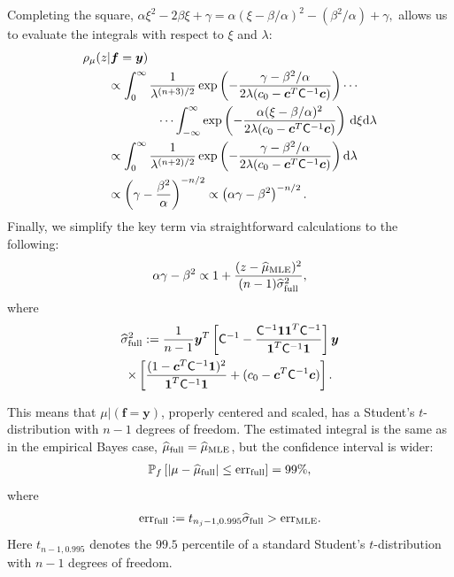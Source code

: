 \documentclass[twocolumn]{svjour3}          %
\newcommand{\bm}[1]{\boldsymbol{#1}}
\newcommand{\D}[1]{\text{d}{#1}}
\newcommand{\vc}{\bm{c}}
\newcommand{\vf}{\bm{f}}
\newcommand{\vy}{\bm{y}}
\newcommand{\vone}{\bm{1}}
\newcommand{\mC}{\mathsf{C}}
\newcommand{\hmu}{\widehat{\mu}}
\newcommand{\hsigma}{\widehat{\sigma}}
\newcommand{\MLE}{\textup{MLE}}
\newcommand{\full}{\textup{full}}
\newcommand{\err}{\textup{err}}
\begin{document}
Completing the square, $
\alpha \xi^2 -2 \beta \xi + \gamma 
= \alpha (\xi -\beta/\alpha)^2  - (\beta^2/\alpha) + \gamma,
$
allows us to evaluate the integrals with respect to $\xi$ and $\lambda$:
\begin{align*}
\MoveEqLeft{\rho_{\mu}(z | \vf = \vy)} \\
& \propto \displaystyle \int_{0}^\infty  \frac{1}{\lambda^{(n+3)/2}}  \exp\left( -\frac{  \gamma - \beta^2/\alpha}{2\lambda(c_0  -\vc ^T \mC^{-1} \vc)} \right)  \cdots \\
& \qquad \qquad \cdots \int_{-\infty}^\infty  \exp\left( -\frac{\alpha (\xi -\beta/\alpha)^2}{2\lambda(c_0  -\vc ^T \mC^{-1} \vc)} \right) \, \D \xi \D \lambda \\
& \propto \displaystyle \int_{0}^\infty  \frac{1}{\lambda^{(n+2)/2}}  \exp\left( -\frac{  \gamma - \beta^2/\alpha}{2\lambda(c_0  -\vc ^T \mC^{-1} \vc)} \right) \D \lambda \\
& \propto \left(\gamma - \frac{\beta^2}{\alpha}\right)^{-n/2} \propto \left(\alpha \gamma - \beta^2\right)^{-n/2}.
\end{align*}
Finally, we simplify the key term via straightforward calculations to the following:
\begin{align*}
\alpha \gamma - \beta^2 \propto 1 +  \frac{(z - \hmu_{\textup{MLE}})^2}{(n-1)\widehat{\sigma}_{\textup{full}}^2}, \\
\end{align*}
where 
\begin{multline*}
\hsigma^2_{\textup{full}} 
:= \frac{1}{n-1}
\vy^T\left[ \mC^{-1} 
- \frac{ \mC^{-1} \vone\vone^T \mC^{-1}}{\vone^T \mC^{-1} \vone}  \right]\vy
\\ 
\times  \left[\frac{(1 - \vc^T \mC^{-1} \vone)^2}{\vone^T \mC^{-1} \vone} + (c_0  -\vc ^T \mC^{-1} \vc) \right].
\end{multline*}

This means that $\mu \vert (\vf = \vy )$, properly centered and scaled, has a Student's $t$-distribution with $n-1$ degrees of freedom.   The estimated integral is the same as in the empirical Bayes case, $\hmu_{\textup{full}} = \hmu_{\MLE}$, but the confidence interval is wider:
\begin{align}
\label{eqn_prob_CI_full}
\mathbb{P}_f \left[
|\mu-\hmu_\full| \leq \err_{\full} \right]  = 99\%,
\end{align}
where
\begin{align}
\label{FJH:eq:errFull}
\err_{\textup{full}} 
:= t_{n_j-1,0.995} \hsigma_{\textup{full}} > \err_\MLE .
\end{align}
Here $t_{n-1,0.995}$ denotes the $99.5$ percentile of a standard Student's $t$-distribution with $n-1$ degrees of freedom.
\end{document}
